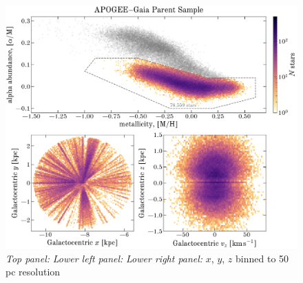 \documentclass[modern]{aastex63}
\begin{document}
\begin{figure}[!tp]
  \begin{center}
  \includegraphics[width=\textwidth]{mh-am-xy.pdf}
  \end{center}
  \caption{%
    \textsl{Top panel:}
    \textsl{Lower left panel:}
    \textsl{Lower right panel:}
    $x$, $y$, $z$ binned to 50 pc resolution
  \label{fig:mh-am-xy}
  }
\end{figure}
\end{document}

